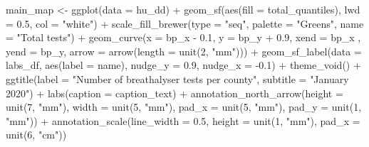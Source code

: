 \documentclass[
]{book}
\makeatletter
\newenvironment{Shaded}{\begin{snugshade}}{\end{snugshade}}
\newcommand{\AttributeTok}[1]{\textcolor[rgb]{0.61,0.61,0.61}{#1}}
\newcommand{\DecValTok}[1]{\textcolor[rgb]{0.06,0.06,0.06}{#1}}
\newcommand{\FloatTok}[1]{\textcolor[rgb]{0.06,0.06,0.06}{#1}}
\newcommand{\FunctionTok}[1]{\textcolor[rgb]{0,0,0}{#1}}
\newcommand{\NormalTok}[1]{#1}
\newcommand{\OtherTok}[1]{\textcolor[rgb]{0.37,0.37,0.37}{#1}}
\newcommand{\SpecialCharTok}[1]{\textcolor[rgb]{0,0,0}{#1}}
\newcommand{\StringTok}[1]{\textcolor[rgb]{0.5,0.5,0.5}{#1}}
\newenvironment{kframe}{%
\medskip{}
\setlength{\fboxsep}{.8em}
 \def\at@end@of@kframe{}%
 \ifinner\ifhmode%
  \def\at@end@of@kframe{\end{minipage}}%
  \begin{minipage}{\columnwidth}%
 \fi\fi%
 \def\FrameCommand##1{\hskip\@totalleftmargin \hskip-\fboxsep
 \colorbox{shadecolor}{##1}\hskip-\fboxsep
     \hskip-\linewidth \hskip-\@totalleftmargin \hskip\columnwidth}%
 \MakeFramed {\advance\hsize-\width
   \@totalleftmargin\z@ \linewidth\hsize
   \@setminipage}}%
 {\par\unskip\endMakeFramed%
 \at@end@of@kframe}
\renewenvironment{Shaded}{\begin{kframe}}{\end{kframe}}
\makeatother
\begin{document}
\begin{Shaded}
\begin{Highlighting}[]
\NormalTok{main\_map }\OtherTok{\textless{}{-}} \FunctionTok{ggplot}\NormalTok{(}\AttributeTok{data =}\NormalTok{ hu\_dd) }\SpecialCharTok{+} 
  \FunctionTok{geom\_sf}\NormalTok{(}\FunctionTok{aes}\NormalTok{(}\AttributeTok{fill =}\NormalTok{ total\_quantiles), }
          \AttributeTok{lwd =} \FloatTok{0.5}\NormalTok{, }
          \AttributeTok{col =} \StringTok{"white"}\NormalTok{) }\SpecialCharTok{+} 
  \FunctionTok{scale\_fill\_brewer}\NormalTok{(}\AttributeTok{type =} \StringTok{"seq"}\NormalTok{, }
                    \AttributeTok{palette =} \StringTok{"Greens"}\NormalTok{, }
                    \AttributeTok{name =} \StringTok{"Total tests"}\NormalTok{) }\SpecialCharTok{+} 
  \FunctionTok{geom\_curve}\NormalTok{(}\AttributeTok{x =}\NormalTok{ bp\_x }\SpecialCharTok{{-}} \FloatTok{0.1}\NormalTok{, }
             \AttributeTok{y =}\NormalTok{ bp\_y }\SpecialCharTok{+} \FloatTok{0.9}\NormalTok{, }
             \AttributeTok{xend =}\NormalTok{ bp\_x , }
             \AttributeTok{yend =}\NormalTok{ bp\_y, }
             \AttributeTok{arrow =} \FunctionTok{arrow}\NormalTok{(}\AttributeTok{length =} \FunctionTok{unit}\NormalTok{(}\DecValTok{2}\NormalTok{, }\StringTok{"mm"}\NormalTok{))) }\SpecialCharTok{+}
  \FunctionTok{geom\_sf\_label}\NormalTok{(}\AttributeTok{data =}\NormalTok{ labs\_df, }
                \FunctionTok{aes}\NormalTok{(}\AttributeTok{label =}\NormalTok{ name), }
                \AttributeTok{nudge\_y =} \FloatTok{0.9}\NormalTok{, }
                \AttributeTok{nudge\_x =} \SpecialCharTok{{-}}\FloatTok{0.1}\NormalTok{) }\SpecialCharTok{+} 
  \FunctionTok{theme\_void}\NormalTok{() }\SpecialCharTok{+} 
  \FunctionTok{ggtitle}\NormalTok{(}\AttributeTok{label =} \StringTok{"Number of breathalyser tests per county"}\NormalTok{, }
          \AttributeTok{subtitle =} \StringTok{"January 2020"}\NormalTok{) }\SpecialCharTok{+} 
  \FunctionTok{labs}\NormalTok{(}\AttributeTok{caption =}\NormalTok{ caption\_text) }\SpecialCharTok{+} 
  \FunctionTok{annotation\_north\_arrow}\NormalTok{(}\AttributeTok{height =} \FunctionTok{unit}\NormalTok{(}\DecValTok{7}\NormalTok{, }\StringTok{"mm"}\NormalTok{), }
                         \AttributeTok{width =} \FunctionTok{unit}\NormalTok{(}\DecValTok{5}\NormalTok{, }\StringTok{"mm"}\NormalTok{), }
                         \AttributeTok{pad\_x =} \FunctionTok{unit}\NormalTok{(}\DecValTok{5}\NormalTok{, }\StringTok{"mm"}\NormalTok{), }
                         \AttributeTok{pad\_y =} \FunctionTok{unit}\NormalTok{(}\DecValTok{1}\NormalTok{, }\StringTok{"mm"}\NormalTok{)) }\SpecialCharTok{+} 
  \FunctionTok{annotation\_scale}\NormalTok{(}\AttributeTok{line\_width =} \FloatTok{0.5}\NormalTok{, }
                   \AttributeTok{height =} \FunctionTok{unit}\NormalTok{(}\DecValTok{1}\NormalTok{, }\StringTok{"mm"}\NormalTok{), }
                   \AttributeTok{pad\_x =} \FunctionTok{unit}\NormalTok{(}\DecValTok{6}\NormalTok{, }\StringTok{"cm"}\NormalTok{)) }
\end{Highlighting}
\end{Shaded}
\end{document}
